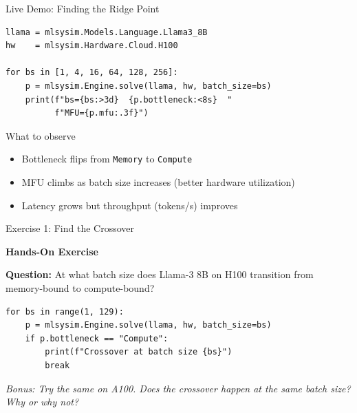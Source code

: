\documentclass[aspectratio=169, 12pt]{beamer}
\begin{document}
\begin{frame}[fragile]{Live Demo: Finding the Ridge Point}

\small
\begin{lstlisting}
llama = mlsysim.Models.Language.Llama3_8B
hw    = mlsysim.Hardware.Cloud.H100

for bs in [1, 4, 16, 64, 128, 256]:
    p = mlsysim.Engine.solve(llama, hw, batch_size=bs)
    print(f"bs={bs:>3d}  {p.bottleneck:<8s}  "
          f"MFU={p.mfu:.3f}")
\end{lstlisting}

\vspace{0.3cm}
\begin{exampleblock}{What to observe}
  \begin{itemize}
    \item Bottleneck flips from \texttt{Memory} to \texttt{Compute}
    \item MFU climbs as batch size increases (better hardware utilization)
    \item Latency grows but throughput (tokens/s) improves
  \end{itemize}
\end{exampleblock}
\end{frame}

\begin{frame}[fragile]{Exercise 1: Find the Crossover}

\centering
\Large\bfseries
Hands-On Exercise\\[0.5cm]
\normalsize

\textbf{Question:} At what batch size does Llama-3 8B on H100
transition from memory-bound to compute-bound?

\vspace{0.3cm}
\begin{lstlisting}
for bs in range(1, 129):
    p = mlsysim.Engine.solve(llama, hw, batch_size=bs)
    if p.bottleneck == "Compute":
        print(f"Crossover at batch size {bs}")
        break
\end{lstlisting}

\vspace{0.3cm}
\textit{Bonus: Try the same on A100. Does the crossover happen
at the same batch size? Why or why not?}
\end{frame}
\end{document}

